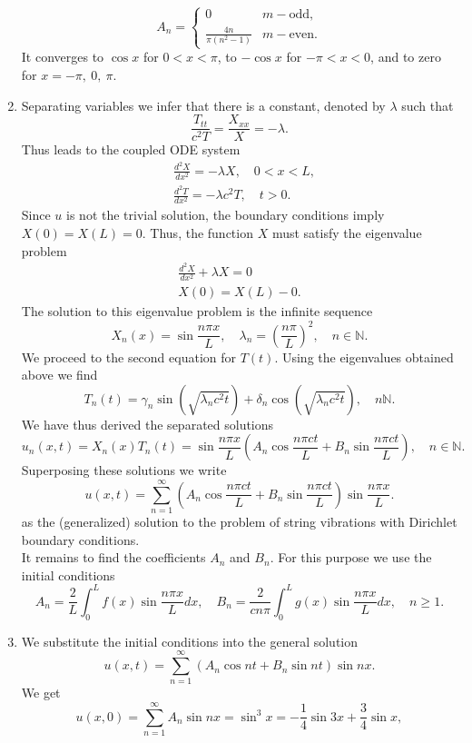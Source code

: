 \documentclass[11pt,a4paper]{article}
\begin{document}
\begin{enumerate}
		$$
		A_n =
		\begin{cases}
			0 & m-\text{odd},\\
			\frac{4n}{\pi(n^2 - 1)} & m - \text{even}.
		\end{cases}
		$$ 
		It converges to $\cos x$ for $0 < x < \pi$, to $-\cos x$ for $-\pi < x < 0$, and to zero for $x = -\pi,\ 0,\ \pi$.
		\item Separating variables we infer that there is a constant, denoted by $\lambda$ such that
		$$
		\frac{T_{tt}}{c^2T} = \frac{X_{xx}}{X} = -\lambda.
		$$
		Thus leads to the coupled ODE system
		\begin{align*}
			&\frac{d^2X}{dx^2} = -\lambda X,\quad 0 < x < L,\\
			&\frac{d^2T}{dx^2} = -\lambda c^2 T, \quad t > 0.
		\end{align*}
		Since $u$ is not the trivial solution, the boundary conditions imply $X(0) = X(L) = 0$. Thus, the function $X$ must satisfy the eigenvalue problem
		\begin{align*}
			\frac{d^2X}{dx^2} + \lambda X = 0\\
			X(0) = X(L) - 0.
		\end{align*}
		The solution to this eigenvalue problem is the infinite sequence
		$$
		X_n(x) = \sin\frac{n\pi x}{L},\quad \lambda_n = \left(\frac{n\pi}{L}\right)^2,\quad n\in \mathbb{N}.
		$$
		We proceed to the second equation for $T(t)$. Using the eigenvalues obtained above we find
		$$
		T_n(t) = \gamma_n \sin (\sqrt{\lambda_nc^2 t}) + \delta_n\cos(\sqrt{\lambda_nc^2t}),\quad n\mathbb{N}.
		$$
		We have thus derived the separated solutions
		$$
		u_n(x, t) = X_n(x)T_n(t) = \sin\frac{n\pi x}{L}\left(A_n\cos\frac{n\pi ct}{L} + B_n\sin\frac{n\pi ct}{L}\right),\quad n\in \mathbb{N}.
		$$
		Superposing these solutions we write
		$$
		u(x, t) = \sum_{n = 1}^\infty\left(A_n\cos\frac{n\pi ct}{L} + B_n\sin\frac{n\pi ct}{L}\right)\sin\frac{n\pi x}{L}.
		$$
		as the (generalized) solution to the problem of string vibrations with Dirichlet boundary conditions.\\
		It remains to find the coefficients $A_n$ and $B_n$. For this purpose we use the initial conditions
		$$
		A_n = \frac{2}{L}\int_0^Lf(x)\sin\frac{n\pi x}{L}dx,\quad B_n = \frac{2}{cn\pi}\int_0^Lg(x)\sin\frac{n\pi x}{L}dx,\quad n\geq 1.
		$$
		\item We substitute the initial conditions into the general solution
		$$
		u(x,t) = \sum_{n = 1}^\infty(A_n\cos nt + B_n\sin nt)\sin nx.
		$$
		We get
		$$
		u(x, 0) = \sum_{n = 1}^\infty A_n\sin nx = \sin^3x = -\frac{1}{4}\sin 3x + \frac{3}{4}\sin x,
$$
\end{enumerate}
\end{document}
